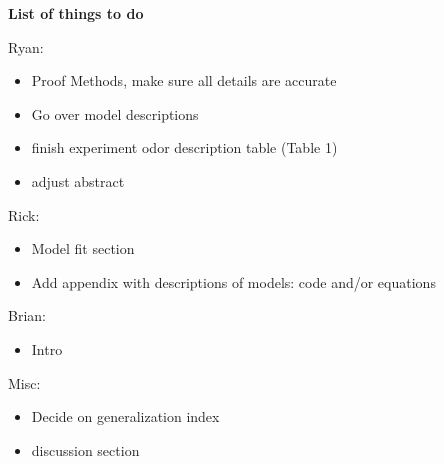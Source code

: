 \textbf{List of things to do}

Ryan:
\begin{itemize}
\item Proof Methods, make sure all details are accurate
\item Go over model descriptions
\item finish experiment odor description table (Table 1)
\item adjust abstract
\end{itemize}
Rick:
\begin{itemize}
\item Model fit section
\item Add appendix with descriptions of models: code and/or equations
\end{itemize}

Brian:
\begin{itemize}
\item Intro
\end{itemize}

Misc:
\begin{itemize}
\item Decide on generalization index
\item discussion section
\end{itemize}
